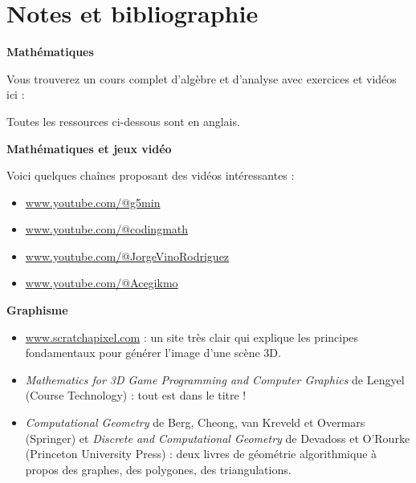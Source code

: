 
\clearemptydoublepage
\pagestyle{empty}\thispagestyle{empty}

\vspace*{\fill}

\section*{Notes et bibliographie}



\textbf{Mathématiques}

Vous trouverez un cours complet d'algèbre et d'analyse avec exercices et vidéos ici : 

\smallskip

Toutes les ressources ci-dessous sont en anglais.


\smallskip


\textbf{Mathématiques et jeux vidéo}

Voici quelques chaînes proposant des vidéos intéressantes :
\begin{itemize}	
  \item \href{https://www.youtube.com/@g5min}{www.youtube.com/@g5min}

  \item \href{https://www.youtube.com/@codingmath}{www.youtube.com/@codingmath}

  \item \href{https://www.youtube.com/@JorgeVinoRodriguez}{www.youtube.com/@JorgeVinoRodriguez}

  \item \href{https://www.youtube.com/@Acegikmo}{www.youtube.com/@Acegikmo}
\end{itemize}

\smallskip

\textbf{Graphisme}

\begin{itemize}
	\item \href{https://www.scratchapixel.com/}{www.scratchapixel.com} : un site très clair qui explique les principes fondamentaux pour générer l'image d'une scène 3D.
	
    \item \emph{Mathematics for	3D Game Programming	and Computer Graphics} de Lengyel (Course Technology) : tout est dans le titre !	
	
	\item \emph{Computational Geometry} de Berg, Cheong, van Kreveld et Overmars (Springer) et 
	\emph{Discrete and Computational Geometry} de Devadoss et O'Rourke (Princeton University Press) :
	deux livres de géométrie algorithmique à propos des graphes, des polygones, des triangulations.

\end{itemize}


